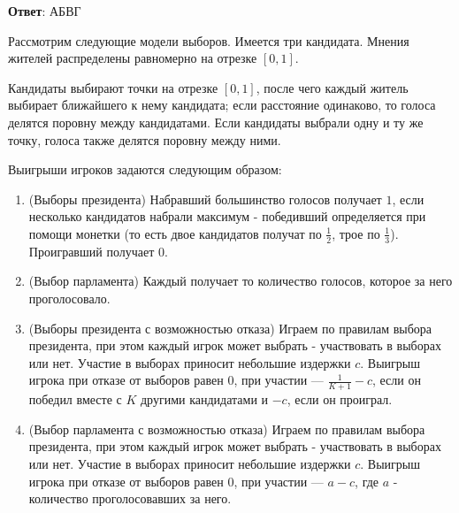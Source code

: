 \textbf{Ответ}: 
АБВГ  %

\solution %

\task
Рассмотрим следующие модели выборов. Имеется три кандидата. Мнения жителей распределены равномерно на отрезке $[0,1]$.

Кандидаты выбирают точки на отрезке $[0,1]$, после чего каждый житель выбирает ближайшего к нему кандидата; если расстояние одинаково, то голоса делятся поровну между кандидатами. Если кандидаты выбрали одну и ту же точку, голоса также делятся поровну между ними.

Выигрыши игроков задаются следующим образом:
\begin{enumerate}[label=--]
	\item (Выборы президента) Набравший большинство голосов получает $1$, если несколько кандидатов набрали максимум - победивший определяется при помощи монетки (то есть двое кандидатов получат по $\frac{1}{2}$, трое по $\frac{1}{3}$). Проигравший получает $0$.
	\item (Выбор парламента) Каждый получает то количество голосов, которое за него проголосовало.
	\item (Выборы президента с возможностью отказа) Играем по правилам выбора президента, при этом каждый игрок может выбрать - участвовать в выборах или нет. Участие в выборах приносит небольшие издержки $c$. Выигрыш игрока при отказе от выборов равен $0$, при участии --- $\frac{1}{K+1}-c$, если он победил вместе с $K$ другими кандидатами и $-c$, если он проиграл.
	\item (Выбор парламента с возможностью отказа) Играем по правилам выбора президента, при этом каждый игрок может выбрать - участвовать в выборах или нет. Участие в выборах приносит небольшие издержки $c$. Выигрыш игрока при отказе от выборов равен $0$, при участии --- $a-c$, где $a$ - количество проголосовавших за него.
\end{enumerate}

